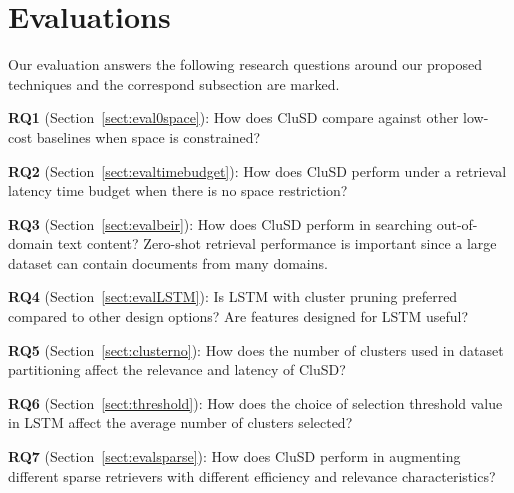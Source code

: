 \section{Evaluations}

Our evaluation answers  the following research questions around our proposed techniques and the correspond subsection are marked.

\textbf{RQ1} (Section~\ref{sect:eval0space}): 
How does CluSD compare against other low-cost baselines when space is constrained?

\textbf{RQ2} (Section~\ref{sect:evaltimebudget}): 
How does CluSD  perform under a retrieval latency time budget when there is no space restriction?

\textbf{RQ3} (Section~\ref{sect:evalbeir}): 
How does CluSD  perform in searching  out-of-domain text content?
Zero-shot retrieval performance is important since a large dataset can contain documents from many domains. 


\textbf{RQ4} (Section~\ref{sect:evalLSTM}): 
Is  LSTM with cluster pruning preferred compared to other design options?
Are  features designed for LSTM useful?

\textbf{RQ5} 
(Section~\ref{sect:clusterno}): 
How does the number of clusters used in dataset partitioning 
affect the relevance and latency of CluSD? 

\textbf{RQ6} 
(Section~\ref{sect:threshold}):
How does the choice of selection threshold value in LSTM affect the average number of clusters selected?

\textbf{RQ7}
(Section~\ref{sect:evalsparse}):
How does CluSD perform in augmenting  different sparse retrievers with different efficiency and relevance characteristics?


